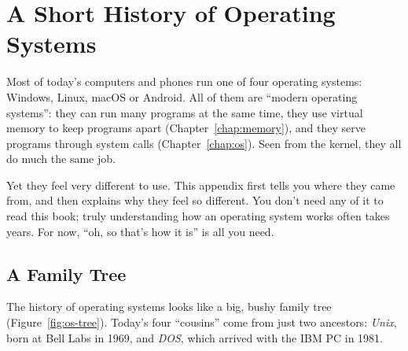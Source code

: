 \chapter{A Short History of Operating Systems}
\label{app:os-history}

Most of today's computers and phones run one of four operating systems: Windows, Linux, macOS or Android. All of them are ``modern operating systems'': they can run many programs at the same time, they use virtual memory to keep programs apart (Chapter~\ref{chap:memory}), and they serve programs through system calls (Chapter~\ref{chap:os}). Seen from the kernel, they all do much the same job.

Yet they feel very different to use. This appendix first tells you where they came from, and then explains why they feel so different. You don't need any of it to read this book; truly understanding how an operating system works often takes years. For now, ``oh, so that's how it is'' is all you need.

\section{A Family Tree}

The history of operating systems looks like a big, bushy family tree (Figure~\ref{fig:os-tree}). Today's four ``cousins'' come from just two ancestors: \emph{Unix}, born at Bell Labs in 1969, and \emph{DOS}, which arrived with the IBM PC in 1981.

